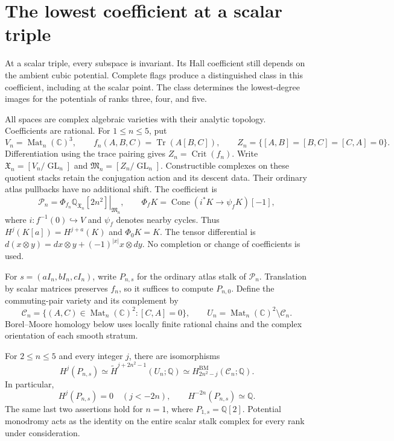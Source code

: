 \section{The lowest coefficient at a scalar triple}
\label{sch:sec:scalar}

At a scalar triple, every subspace is invariant. Its Hall coefficient
still depends on the ambient cubic potential. Complete flags produce
a distinguished class in this coefficient, including at the scalar point.
The class determines the lowest-degree images for the potentials of
ranks three, four, and five.

All spaces are complex algebraic varieties with their analytic topology.
Coefficients are rational. For $1\leq n\leq5$, put
\[
 V_n=\operatorname{Mat}_n(\mathbb C)^3,\qquad
 f_n(A,B,C)=\operatorname{Tr}(A[B,C]),\qquad
 Z_n=\{[A,B]=[B,C]=[C,A]=0\}.
\]
Differentiation using the trace pairing gives $Z_n=\operatorname{Crit}(f_n)$.
Write $\mathfrak X_n=[V_n/\operatorname{GL}_n]$ and
$\mathfrak M_n=[Z_n/\operatorname{GL}_n]$. Constructible complexes on
these quotient stacks retain the conjugation action and its descent data.
Their ordinary atlas pullbacks have no additional shift. The coefficient is
\[
 \mathcal P_n=
 \left.\Phi_{f_n}\mathbb Q_{\mathfrak X_n}[2n^2]\right|_{\mathfrak M_n},
 \qquad
 \Phi_fK=\operatorname{Cone}(i^*K\longrightarrow\psi_fK)[-1],
\]
where $i:f^{-1}(0)\hookrightarrow V$ and $\psi_f$ denotes nearby cycles.
Thus $H^j(K[a])=H^{j+a}(K)$ and $\Phi_0K=K$.
The tensor differential is
$d(x\otimes y)=dx\otimes y+(-1)^{|x|}x\otimes dy$.
No completion or change of coefficients is used.

For $s=(aI_n,bI_n,cI_n)$, write $P_{n,s}$ for the ordinary atlas
stalk of $\mathcal P_n$. Translation by scalar matrices preserves $f_n$,
so it suffices to compute $P_{n,0}$.
Define the commuting-pair variety and its complement by
\[
 \mathcal C_n=\{(A,C)\in\operatorname{Mat}_n(\mathbb C)^2:[C,A]=0\},
 \qquad U_n=\operatorname{Mat}_n(\mathbb C)^2\setminus\mathcal C_n.
\]
Borel--Moore homology below uses locally finite rational chains and
the complex orientation of each smooth stratum.

\begin{proposition}
\label{sch:prop:scalar}
For $2\leq n\leq5$ and every integer $j$, there are isomorphisms
\begin{equation}
 H^j(P_{n,s})\simeq
 \widetilde H^{j+2n^2-1}(U_n;\mathbb Q)
 \simeq H^{\mathrm{BM}}_{2n^2-j}(\mathcal C_n;\mathbb Q).
 \label{sch:eq:scalar-bm}
\end{equation}
In particular,
\[
 H^j(P_{n,s})=0\quad(j<-2n),\qquad
 H^{-2n}(P_{n,s})\simeq\mathbb Q.
\]
The same last two assertions hold for $n=1$, where
$P_{1,s}=\mathbb Q[2]$. Potential monodromy acts as the identity on
the entire scalar stalk complex for every rank under consideration.
\end{proposition}

